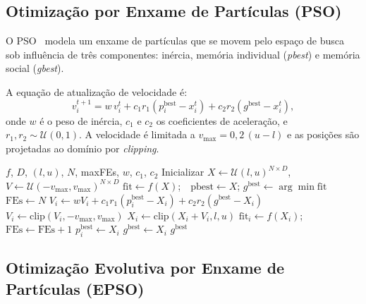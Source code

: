 \documentclass[runningheads]{llncs}
\begin{document}
\subsection{Otimização por Enxame de Partículas (PSO)}

O PSO~\cite{kennedy1995} modela um enxame de partículas que se movem
pelo espaço de busca sob influência de três componentes: inércia,
memória individual (\emph{pbest}) e memória social (\emph{gbest}).

A equação de atualização de velocidade é:
\begin{equation}
  v_i^{t+1} = w\,v_i^t
    + c_1 r_1 (p_i^{\text{best}} - x_i^t)
    + c_2 r_2 (g^{\text{best}} - x_i^t),
\end{equation}
onde $w$ é o peso de inércia, $c_1$ e $c_2$ os coeficientes de
aceleração, e $r_1, r_2 \sim \mathcal{U}(0,1)$. A velocidade é
limitada a $v_{\max} = 0{,}2\,(u - l)$ e as posições são projetadas
ao domínio por \emph{clipping}.

\begin{algorithm}[ht]
\caption{Otimização por Enxame de Partículas (PSO)}
\label{alg:pso}
\begin{algorithmic}[1]
\Require $f$, $D$, $(l,u)$, $N$, maxFEs, $w$, $c_1$, $c_2$
\State Inicializar $X \leftarrow \mathcal{U}(l,u)^{N\times D}$,
       $V \leftarrow \mathcal{U}(-v_{\max},v_{\max})^{N\times D}$
\State $\text{fit} \leftarrow f(X)$;\ \ $\text{pbest} \leftarrow X$;
       $g^{\text{best}} \leftarrow \arg\min \text{fit}$
\State $\text{FEs} \leftarrow N$
    \State $V_i \leftarrow w V_i + c_1 r_1(p_i^{\text{best}}-X_i)
           + c_2 r_2(g^{\text{best}}-X_i)$
    \State $V_i \leftarrow \text{clip}(V_i,-v_{\max},v_{\max})$
    \State $X_i \leftarrow \text{clip}(X_i + V_i, l, u)$
    \State $\text{fit}_i \leftarrow f(X_i)$;\ \
           $\text{FEs} \leftarrow \text{FEs}+1$
      \State $p_i^{\text{best}} \leftarrow X_i$
        \State $g^{\text{best}} \leftarrow X_i$
      \EndIf
    \EndIf
  \EndFor
\EndWhile
\State \Return $g^{\text{best}}$
\end{algorithmic}
\end{algorithm}

\subsection{Otimização Evolutiva por Enxame de Partículas (EPSO)}
\end{document}
